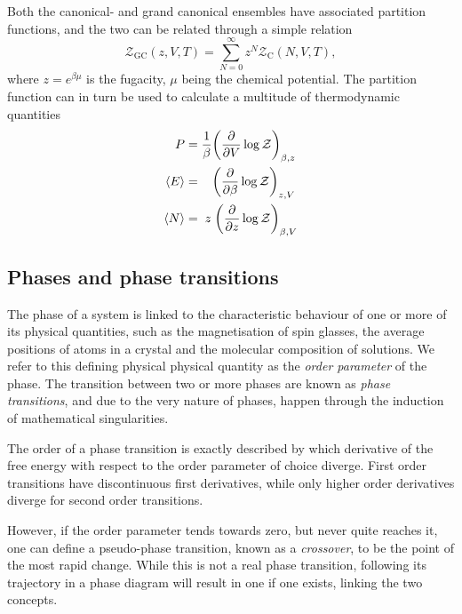 Both the canonical- and grand canonical ensembles have associated partition
functions, and the two can be related through a simple relation
%
\begin{equation}
  \mathcal{Z}_{\text{GC}}(z, V, T) = \sum_{N=0}^{\infty} z^N \mathcal{Z}_{\text{C}}(N, V, T),
\end{equation}
%
where $z = e^{\beta \mu}$ is the fugacity, $\mu$ being the chemical
potential. The partition function can in turn be used to calculate a multitude
of thermodynamic quantities
%
\begin{align}
  P &= \frac{1}{\beta} \bigg( \frac{\partial}{\partial V} \log \mathcal{Z}
    \bigg)_{\beta,z} \\
  \langle E \rangle &= \hphantom{\frac{1}{\beta}} \bigg( \frac{\partial}{\partial \beta}
    \log \mathcal{Z} \bigg)_{z,V} \\
  \langle N \rangle &= \;z\; \bigg( \frac{\partial}{\partial z}
    \log \mathcal{Z} \bigg)_{\beta,V}
\end{align}

\subsection{Phases and phase transitions}

The phase of a system is linked to the characteristic behaviour of one or more
of its physical quantities, such as the magnetisation of spin glasses, the
average positions of atoms in a crystal and the molecular composition of
solutions. We refer to this defining physical physical quantity as the
\emph{order parameter} of the phase.  The transition between two or more phases
are known as \emph{phase transitions}, and due to the very nature of phases,
happen through the induction of mathematical singularities. 

The order of a phase transition is exactly described by which derivative of the
free energy with respect to the order parameter of choice diverge. First order
transitions have discontinuous first derivatives, while only higher order
derivatives diverge for second order transitions.

However, if the order parameter tends towards zero, but never quite reaches it,
one can define a pseudo-phase transition, known as a \emph{crossover}, to be the
point of the most rapid change. While this is not a real phase transition,
following its trajectory in a phase diagram will result in one if one exists,
linking the two concepts.


